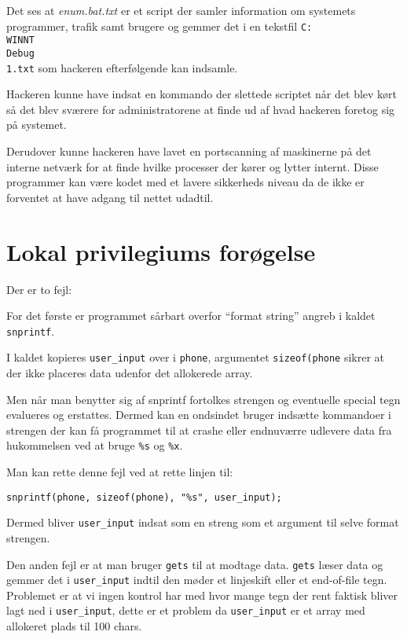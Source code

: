 \documentclass[10pt,a4paper,danish]{article}
\begin{document}
Det ses at \textit{enum.bat.txt} er et script der samler information om
systemets programmer, trafik samt brugere og gemmer det i en tekstfil \texttt{C:\\WINNT\\Debug\\1.txt} som
hackeren efterfølgende kan indsamle.

Hackeren kunne have indsat en kommando der slettede scriptet når det blev kørt
så det blev sværere for administratorene at finde ud af hvad hackeren foretog
sig på systemet.

Derudover kunne hackeren have lavet en portscanning af maskinerne på det interne
netværk for at finde hvilke processer der kører og lytter internt.
Disse programmer kan være kodet med et lavere sikkerheds niveau da de ikke er
forventet at have adgang til nettet udadtil.


\section{Lokal privilegiums forøgelse}

Der er to fejl:

For det første er programmet sårbart overfor ``format string'' angreb i kaldet
\texttt{snprintf}.

I kaldet kopieres \texttt{user\_input} over i \texttt{phone}, argumentet
\texttt{sizeof(phone} sikrer at der ikke placeres data udenfor det allokerede
array.

Men når man benytter sig af snprintf fortolkes strengen og eventuelle special
tegn evalueres og erstattes. Dermed kan en ondsindet bruger indsætte kommandoer
i strengen der kan få programmet til at crashe eller endnuværre udlevere data
fra hukommelsen ved at bruge \texttt{\%s} og \texttt{\%x}.

Man kan rette denne fejl ved at rette linjen til:
\begin{verbatim}
snprintf(phone, sizeof(phone), "%s", user_input);
\end{verbatim}
Dermed bliver \texttt{user\_input} indsat som en streng som et argument til
selve format strengen.


Den anden fejl er at man bruger \texttt{gets} til at modtage data.
\texttt{gets} læser data og gemmer det i \texttt{user\_input} indtil den møder et linjeskift eller et end-of-file
tegn.
Problemet er at vi ingen kontrol har med hvor mange tegn der rent faktisk bliver
lagt ned i \texttt{user\_input}, dette er et problem da \texttt{user\_input} er
et array med allokeret plads til 100 chars.
\end{document}

